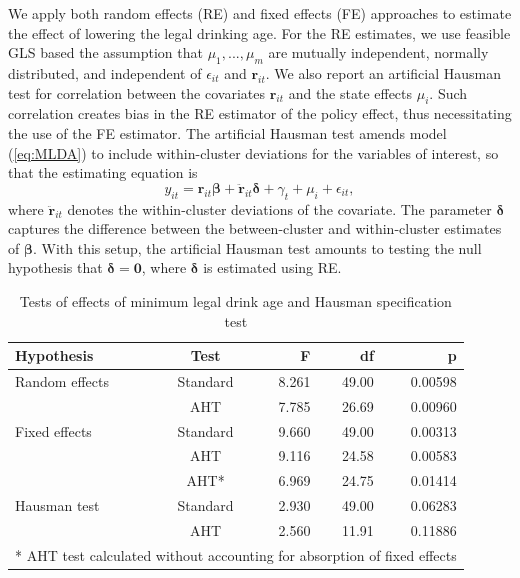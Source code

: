 \documentclass[12pt]{article}\usepackage[]{graphicx}\usepackage[]{color}
\newcommand{\bm}{\mathbf}
\newcommand{\bs}{\boldsymbol}
\begin{document}
We apply both random effects (RE) and fixed effects (FE) approaches to estimate the effect of lowering the legal drinking age. 
For the RE estimates, we use feasible GLS based the assumption that  $\mu_1,...,\mu_m$ are mutually independent, normally distributed, and independent of $\epsilon_{it}$ and $\bm{r}_{it}$.
We also report an artificial Hausman test \citep{Arellano1993on, Wooldridge2010econometric} for correlation between the covariates $\bm{r}_{it}$ and the state effects $\mu_i$. Such correlation creates bias in the RE estimator of the policy effect, thus necessitating the use of the FE estimator.
The artificial Hausman test amends model (\ref{eq:MLDA}) to include within-cluster deviations for the variables of interest, so that the estimating equation is
\begin{equation}
y_{it} = \bm{r}_{it}\bs\beta + \bm{\ddot{r}}_{it}\bs\delta + \gamma_t + \mu_i + \epsilon_{it},
\end{equation}
where $\bm{\ddot{r}}_{it}$ denotes the within-cluster deviations of the covariate.
The parameter $\bs\delta$ captures the difference between the between-cluster and within-cluster estimates of $\bs\beta$. 
With this setup, the artificial Hausman test amounts to testing the null hypothesis that $\bs\delta = \bm{0}$, where $\bs\delta$ is estimated using RE.  

\begin{table}[bth]
\centering
\caption{Tests of effects of minimum legal drink age and Hausman specification test} 
\label{tab:MLDA}
\begin{tabular}{lcrrr}
  \toprule
Hypothesis & Test & F & df & p \\ 
  \midrule
Random effects & Standard & 8.261 & 49.00 & 0.00598 \\ 
   & AHT & 7.785 & 26.69 & 0.00960 \\ 
  Fixed effects & Standard & 9.660 & 49.00 & 0.00313 \\ 
   & AHT & 9.116 & 24.58 & 0.00583 \\ 
   & AHT* & 6.969 & 24.75 & 0.01414 \\ 
   \midrule
Hausman test & Standard & 2.930 & 49.00 & 0.06283 \\ 
   & AHT & 2.560 & 11.91 & 0.11886 \\ 
   \bottomrule
\multicolumn{5}{l}{\small{* AHT test calculated without accounting for absorption of fixed effects}}
\end{tabular}
\end{table}
\end{document}
